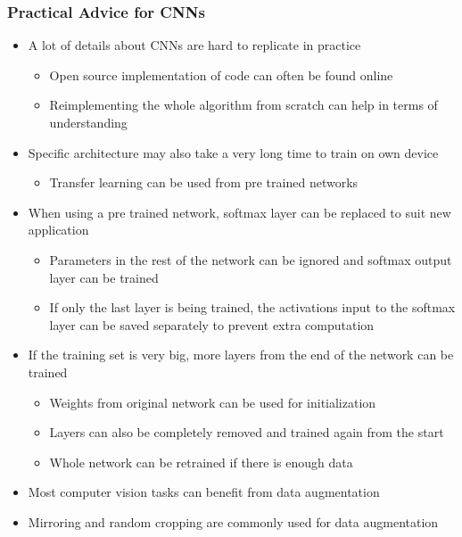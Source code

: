 \documentclass[12pt, letterpaper]{article}
\begin{document}
    \subsubsection{Practical Advice for CNNs}
    \begin{itemize}
        \item A lot of details about CNNs are hard to replicate in practice
        \begin{itemize}
            \item Open source implementation of code can often be found online 
            \item Reimplementing the whole algorithm from scratch can help in terms of understanding
        \end{itemize}
        \item Specific architecture may also take a very long time to train on own device 
        \begin{itemize}
            \item Transfer learning can be used from pre trained networks
        \end{itemize}
        \item When using a pre trained network, softmax layer can be replaced to suit new application
        \begin{itemize}
            \item Parameters in the rest of the network can be ignored and softmax output layer can be trained
            \item If only the last layer is being trained, the activations input to the softmax layer can be saved separately to prevent extra computation
        \end{itemize}
        \item If the training set is very big, more layers from the end of the network can be trained
        \begin{itemize}
            \item Weights from original network can be used for initialization
            \item Layers can also be completely removed and trained again from the start
            \item Whole network can be retrained if there is enough data
        \end{itemize}
        \item Most computer vision tasks can benefit from data augmentation
        \item Mirroring and random cropping are commonly used for data augmentation

\end{itemize}
\end{document}
